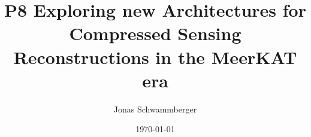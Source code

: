 \documentclass[11pt]{article}
\numberwithin{equation}{section}
\begin{document}
\title{P8 Exploring new Architectures for Compressed Sensing Reconstructions in the MeerKAT era}
\author{Jonas Schwammberger}
\date{\today}
\begin{titlepage}
	\maketitle
	\thispagestyle{empty}
	\setcounter{page}{0}
\end{titlepage}


\newpage
\pagestyle{abstract}


\newpage
\pagestyle{tableofcontent}
\tableofcontents  	
\newpage

\pagestyle{documentstyle}
\setcounter{page}{1}


\newpage

\newpage

\newpage

\newpage
%

\newpage

\newpage


\newpage
{}
%

\newpage
\listoffigures
\listoftables

\newpage

\newpage

\end{document}
